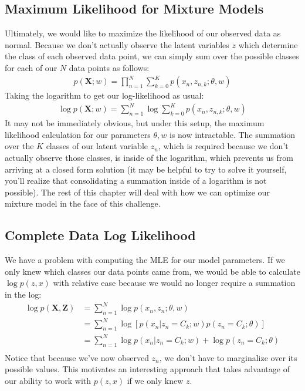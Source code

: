 \subsection{Maximum Likelihood for Mixture Models}
Ultimately, we would like to maximize the likelihood of our observed data as normal. Because we don't actually observe the latent variables $z$ which determine the class of each observed data point, we can simply sum over the possible classes for each of our $N$ data points as follows:
\begin{align*}
    p(\textbf{X}; w) = \prod_{n=1}^{N} \sum_{k=0}^{K} p(x_{n}, z_{n, k}; \theta, w)
\end{align*}
Taking the logarithm to get our log-likelihood as usual:
\begin{align} \label{intractable-log-likelihood}
    \log p(\textbf{X}; w) = \sum_{n=1}^{N} \log \sum_{k=0}^{K} p(x_{n}, z_{n, k}; \theta, w)
\end{align}
It may not be immediately obvious, but under this setup, the maximum likelihood calculation for our parameters $\theta, w$ is now intractable. The summation over the $K$ classes of our latent variable $z_{n}$, which is required because we don't actually observe those classes, is inside of the logarithm, which prevents us from arriving at a closed form solution (it may be helpful to try to solve it yourself, you'll realize that consolidating a summation inside of a logarithm is not possible). The rest of this chapter will deal with how we can optimize our mixture model in the face of this challenge.

\subsection{Complete Data Log Likelihood}
We have a problem with computing the MLE for our model parameters. If we only knew which classes our data points came from, we would be able to calculate $\log p(z, x)$ with relative ease because we would no longer require a summation in the log:
\begin{align} \label{complete-data-log-likelihood}
    \log p(\textbf{X}, \textbf{Z}) &= \sum_{n=1}^{N} \log p(x_n, z_n; \theta, w) \\
    &= \sum_{n=1}^{N} \log[p(x_n | z_n = C_k; w) p(z_n = C_k; \theta)] \\
    &= \sum_{n=1}^{N} \log p(x_n | z_n = C_k; w) + \log p(z_n = C_k; \theta) \\
\end{align}
Notice that because we've now observed $z_{n}$, we don't have to marginalize over its possible values. This motivates an interesting approach that takes advantage of our ability to work with $p(z, x)$ if we only knew $z$.

